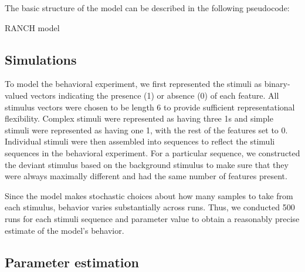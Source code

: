 \documentclass[
  man,floatsintext]{apa6}
\begin{document}
The basic structure of the model can be described in the following pseudocode:

\begin{algorithm}
  \caption*{RANCH model}\label{msn}
  \begin{algorithmic}
    \EndIf
    \EndWhile
  \EndFor
\end{algorithmic}
  \end{algorithm}

\hypertarget{simulations}{%
\subsection{Simulations}\label{simulations}}

To model the behavioral experiment, we first represented the stimuli as binary-valued vectors indicating the presence (1) or absence (0) of each feature. All stimulus vectors were chosen to be length 6 to provide sufficient representational flexibility. Complex stimuli were represented as having three 1s and simple stimuli were represented as having one 1, with the rest of the features set to 0. Individual stimuli were then assembled into sequences to reflect the stimuli sequences in the behavioral experiment. For a particular sequence, we constructed the deviant stimulus based on the background stimulus to make sure that they were always maximally different and had the same number of features present.

Since the model makes stochastic choices about how many samples to take from each stimulus, behavior varies substantially across runs. Thus, we conducted 500 runs for each stimuli sequence and parameter value to obtain a reasonably precise estimate of the model's behavior.

\hypertarget{parameter-estimation}{%
\subsection{Parameter estimation}\label{parameter-estimation}}
\end{document}
